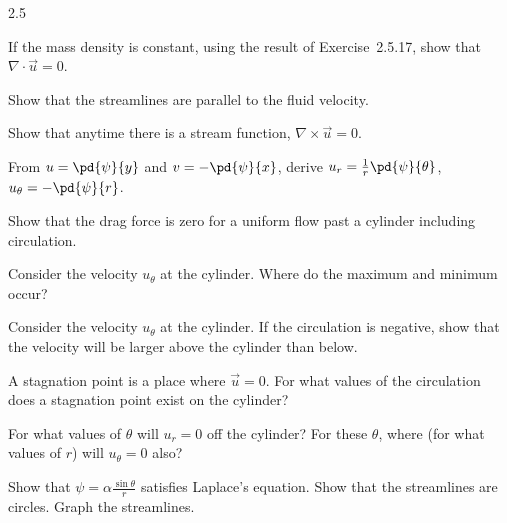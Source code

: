 \begin{exercises}{2.5}
\item If the mass density is constant, using the result of Exercise~2.5.17, show that $\nabla\cdot\vec{u} = 0$.

\item Show that the streamlines are parallel to the fluid velocity.

\item Show that anytime there is a stream function, $\nabla\times\vec{u} = 0$.

\item From $u = \pd{\psi}{y}$ and $v = -\pd{\psi}{x}$, derive $u_r = \frac{1}{r}\pd{\psi}{\theta}$, $u_\theta = -\pd{\psi}{r}$.

\item Show that the drag force is zero for a uniform flow past a cylinder including circulation.

\item Consider the velocity $u_\theta$ at the cylinder. Where do the maximum and minimum occur?

\item Consider the velocity $u_\theta$ at the cylinder. If the circulation is negative, show that the velocity will be larger above the cylinder than below.

\item A stagnation point is a place where $\vec{u} = 0$. For what values of the circulation does a stagnation point exist on the cylinder?

\item For what values of $\theta$ will $u_r = 0$ off the cylinder? For these $\theta$, where (for what values of $r$) will $u_\theta = 0$ also?

\item Show that $\psi = \alpha\frac{\sin\theta}{r}$ satisfies Laplace's equation. Show that the streamlines are circles. Graph the streamlines.

\end{exercises}

